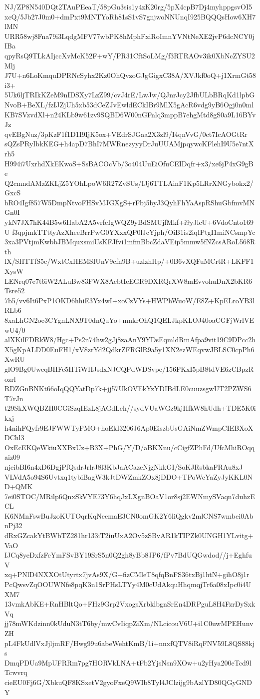 NJ/ZP8N540DQt2TAuPEeaT/58pGu3sis1y4zK20rg/5pX4cpB7Dj4myhppgsvOI5
xcQ/5Jb27J0m0+dmPxt9MNTYoRh81sS1vS7gnjwoNNUnqI925BQQQsHow6XH7lMN
URR58wj8Fna79i3LqdgMFV77wbPK8hMphFxiRoImnYVNtNeXE2jvP6dcNCY0jIBa
qpyRsQ9TLkAIjccXvMcK52F+wY/PR31CftSoLMg/f3RTRAOv3ik0XbNcZYSU2Mlj
J7U+n6LoKmquDPRNcSyhx2Kz0OhQvzoGJgGigxC38A/XVJkf0oQ+j1XrmGt58i3+
5Uk6ljTRIkKZeM9nIDSXy7LzZ99/cvJ4rE/LwJw/QJnrJcy2JfbULbBRqKd1lpbG
NvoB+BeXL/fzIJZjUh5xb53dCeZJvEwldECkIBr9MlX5gAcR6vdg9yB6Ogj0n0ml
KB7SVzvdXl+n24KLb9w61zv9SQBD6W00nGFnlq3mppB7ehgMtd8gS0a9L16BYvJz
qvEBgNuz/3pKzF1f1D1I9IjK5ox+VEdrSJGaa2X3zl9/I4qnVvG/0ct7IcAOGtRr
sQZsPRyIbkKEG+h4apD7BhI7MWRnezyyyDrJuUUAMjpqywcKFlehI9U5e7ntXrh5
H994i7UxrhdXkEKwoS+SsBACOcVb/3o404UuEiOfuCEIDqfr+x3/xe6jP4xG9gBe
Q2cmndAMzZKLjZ5YOhLpoW6R27ZvSUs/IJj6TTLAinF1Kp5LRrXNGybokx2/GxcS
bRO4Igf857W5DmpNtvoFHSvMJGXgS+rFbj5byJ3QyhFhYaAspRShuGbfmvMNGn0I
ykN7JX7hK44B5w6HabA2A5vrfcIgWQZ9yBdSMUjfMkf+i9yJlcU+6VdoCnto169U
f3qpjmkTTttyAzXheeBrrPwG0YXxxQP0lJcYjph/OiB1is2iqIPtgI1miNCsmpYc
3xa3PVtjmKwbbJBMquxsmiUsKFJfvi1mfmBbcZdaVEip5mmw5fNZcsARoL568Rth
lX/SHTTfS5c/WxtCxHEMSIUnV9cfn9B+uzlzhHp/+0B6vXQFuMCrtR+LKFF1XysW
LENrq07e7t6iW2ALuBw83FWX8AcbtIeEGR9DXRQrXW8mEvvohuDnX2bKR6Tsre52
7b5/vv6It6PxP1OKD6hhiE3Yx4wI+xoCzVYs+HWPhWuoW/E8Z+KpELroYB3lRLb6
8xaLhGN2oe3CYgnLNX9T0dnQuYo+mnkrOhQ1QELJkpKLOJ40oaCGFjWrlVEwU4/0
alXKilFDRkW8/Hgc+Ps2n74hw2gJj8zaAnY9YDsEqmldRmAfpa9vit19C9DPcc2h
X5gKpALDD0EuFH1/xV8zrYd2QdkrZFRGlR9a5y1XN2ezWEqvwJBLSC0cpPh6XwRU
glO9Bg0UweqBHFc5HTiWHJsdxNJCQPdWDSvpe/156FKxI5pB8tdVE6zCBpzRozrl
RDZGnBNKt66oIqQQYatDp7k+jj57UkOVEkYzYDIBdLE0cuuzsgwUT2PZWS6T7rJn
t29SkXWQBZH0CGiSzqIEzL8jAGdLeh//sydVUaWGz9kjHfkW8hUdh+TDE5K0ikxj
h4nihFQyfr9EJFWWTyFMO+hoEkI3206J6Ap0EiszbUsGAiNmZWmpCIEBXoXDChl3
OxEcEKQeWkiuXXBxUz+B3X+PhG/Y/D/aBKXnu/cCigfZPhFd/UfcMhiROqqaiz09
njeibBI6n4xD6DgjPfQsdrJrlrJ8l3KbJaACazeNjgNkkGI/SoKJRsbkaFRAu8xJ
VLVdA5o94S6Uvtxq1tybiBagW3kJtDWZmkZOx8jDDO+TPoWcYaZyJyKKL0ND+QMK
7ei0STOC/MRilp6QnxSkVYE73Y6hqJxLXgnBOaV1or8sj2EWNmySVaqn7duhzECL
K6NMnFswBuJzoKUTOqrKqNeemaE3CN0omGK2Y6liQgkv2mlCNS7wmbei0AbnPj32
dRxGZcakYtBWbTZ281hr133iT2iuUxA2Ov5zSBvAR1kTIPZk0UNGH1YLvitg+VaO
IJCq8yeDxfzFeYmFSvBY19SrS5n0Q2gh8yBb8JP6/fPv7BdUQGwdod//j+EghfuV
xq+PNlD4NXXOtUtyrtx7jvAs9X/G+fizCMleT8qfqBnFS36txBj1htN+gihO8j1r
PcQwsvZqOOUWNfe8pqK3n1SrPHsLTYy4M0cUdAkquHhqmqjTr6a08xIpc0i4UXM7
13vmkAbKE+RnHBltQo+FHz9Grp2VxogsXrbklbgnSrEn4DRPguL8H4FzrDySxkVq
jj78mWKdzinn0kUduN3tT6by/mwCvIiqpZiXm/NLcicouV6U+i1C0uwMPEHunvZH
pL4FkUdlVxJjljmRF/Hwg99u6abeWehtKmB/1i+nnxfQTV8iRqFNV59L8QS88kjs
DmqPDUa9MpUFRRm7pg7HORVkLNA+tFb2YjsNsn9XOw+u2yHya200eTcd9lTcwvrq
cieEU0Fj6G/XbkuQF8KSxetV2gyoFxeQ9WIb8Tyl4JClzijg9bAzlYD80QGyGNDY
